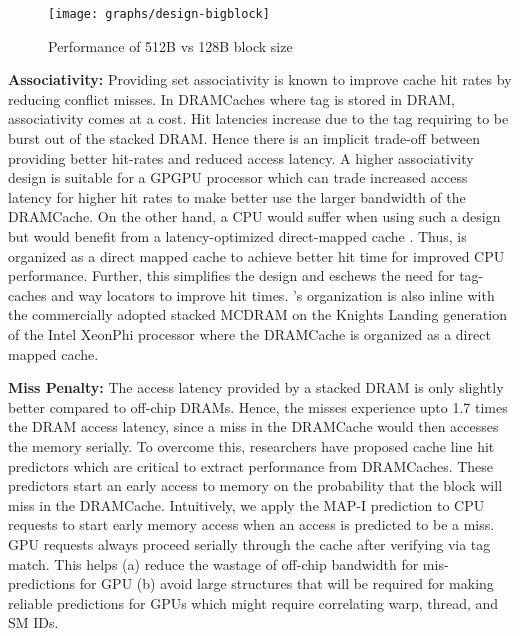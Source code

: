 \begin{figure}[htbp]
   \texttt{[image: graphs/design-bigblock]}
   \caption{Performance of 512B vs 128B block size}	
   \label{fig:design-bigblock}
\end{figure}

\par \textbf{Associativity:} Providing set associativity is known to improve cache hit rates by reducing conflict misses. In DRAMCaches where tag is stored in DRAM,  associativity comes at a cost. Hit latencies increase due to the tag requiring to be burst out of the stacked DRAM. Hence there is an implicit trade-off between providing better hit-rates and reduced access latency. A higher associativity design is suitable for a GPGPU processor which can trade increased access latency for higher hit rates to make better use the larger bandwidth of the DRAMCache. On the other hand, a CPU would suffer when using such a design but would benefit from a latency-optimized direct-mapped cache \cite{alloy}. Thus, \cachename is organized as a direct mapped cache to achieve better hit time for improved CPU performance. Further, this simplifies the design and eschews the need for tag-caches \cite{atcache} and way locators \cite{bimodal} to improve hit times. \cachename's organization is also inline with the commercially adopted stacked MCDRAM on the Knights Landing generation of the Intel XeonPhi processor \cite{xeonphi} where the DRAMCache is organized as a direct mapped cache.

\par \textbf{Miss Penalty:} The access latency provided by a stacked DRAM is only slightly better compared to off-chip DRAMs. Hence, the misses experience upto 1.7 times the DRAM access latency, since a miss in the DRAMCache would then accesses the memory serially. To overcome this, researchers have proposed cache line hit predictors \cite{loh-hill,alloy} which are critical to extract performance from DRAMCaches. These predictors start an early access to memory on the probability that the block will miss in the DRAMCache. Intuitively, we apply the MAP-I prediction \cite{alloy} to CPU requests to start early memory access when an access is predicted to be a miss. GPU requests always proceed serially through the cache after verifying via tag match. This helps (a) reduce the wastage of off-chip bandwidth for mis-predictions for GPU (b) avoid large structures that will be required for making reliable predictions for GPUs which might require correlating warp, thread, and SM IDs.

